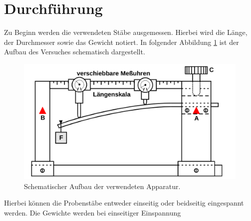 \section{Durchführung}
\label{sec:Durchführung}
Zu Beginn werden die verwendeten Stäbe ausgemessen. Hierbei wird die Länge, der
Durchmesser sowie das Gewicht notiert.
In folgender Abbildung \ref{fig:aufbau} ist der Aufbau des Versuches schematisch dargestellt.
\begin{figure}[H]
  \centering
  \includegraphics[scale=0.4]{content/versuchsaufbau.png}
  \caption{Schematischer Aufbau der verwendeten Apparatur.}
  \label{fig:aufbau}
\end{figure}
Hierbei können die Probenstäbe entweder einseitig oder beidseitig eingespannt
werden. Die Gewichte werden bei einseitiger Einspannung 
